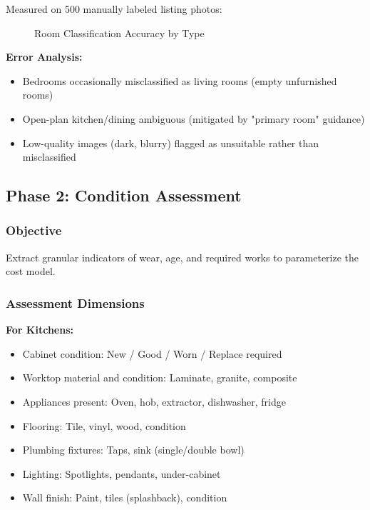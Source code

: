 \documentclass[11pt,a4paper]{article}
\begin{document}
Measured on 500 manually labeled listing photos:

\begin{figure}[H]
\centering
{}
\caption{Room Classification Accuracy by Type}
\end{figure}

\textbf{Error Analysis:}
\begin{itemize}
  \item Bedrooms occasionally misclassified as living rooms (empty unfurnished rooms)
  \item Open-plan kitchen/dining ambiguous (mitigated by "primary room" guidance)
  \item Low-quality images (dark, blurry) flagged as unsuitable rather than misclassified
\end{itemize}

\subsection{Phase 2: Condition Assessment}

\subsubsection{Objective}

Extract granular indicators of wear, age, and required works to parameterize the cost model.

\subsubsection{Assessment Dimensions}

\textbf{For Kitchens:}
\begin{itemize}
  \item Cabinet condition: New / Good / Worn / Replace required
  \item Worktop material and condition: Laminate, granite, composite
  \item Appliances present: Oven, hob, extractor, dishwasher, fridge
  \item Flooring: Tile, vinyl, wood, condition
  \item Plumbing fixtures: Taps, sink (single/double bowl)
  \item Lighting: Spotlights, pendants, under-cabinet
  \item Wall finish: Paint, tiles (splashback), condition
\end{itemize}
\end{document}
